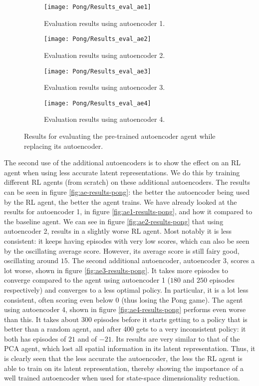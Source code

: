 \begin{figure}[h]
	\centering
	\begin{subfigure}[b]{0.40\textwidth}
		\texttt{[image: Pong/Results\_eval\_ae1]}
		\caption{Evaluation results using autoencoder 1.}
	\end{subfigure}\hfill
	\begin{subfigure}[b]{0.40\textwidth}
		\texttt{[image: Pong/Results\_eval\_ae2]}
		\caption{Evaluation results using autoencoder 2.}
		\medskip
	\end{subfigure}
	\begin{subfigure}[b]{0.4\textwidth}
		\texttt{[image: Pong/Results\_eval\_ae3]}
		\caption{Evaluation results using autoencoder 3.}
	\end{subfigure}\hfill
	\begin{subfigure}[b]{0.4\textwidth}
		\texttt{[image: Pong/Results\_eval\_ae4]}
		\caption{Evaluation results using autoencoder 4.}
	\end{subfigure}
	\caption{Results for evaluating the pre-trained autoencoder agent while replacing its autoencoder.}
	\label{fig:ae-evals}
\end{figure}

The second use of the additional autoencoders is to show the effect on an RL agent when using less accurate latent representations. We do this by training different RL agents (from scratch) on these additional autoencoders. The results can be seen in figure \ref{fig:ae-results-pong}: the better the autoencoder being used by the RL agent, the better the agent trains. We have already looked at the results for autoencoder 1, in figure \ref{fig:ae1-results-pong}, and how it compared to the baseline agent. We can see in figure \ref{fig:ae2-results-pong} that using autoencoder 2, results in a slightly worse RL agent. Most notably it is less consistent: it keeps having episodes with very low scores, which can also be seen by the oscillating average score. However, its average score is still fairy good, oscillating around $15$. The second additional autoencoder, autoencoder 3, scores a lot worse, shown in figure \ref{fig:ae3-results-pong}. It takes more episodes to converge compared to the agent using autoencoder 1 ($180$ and $250$ episodes respectively) and converges to a less optimal policy. In particular, it is a lot less consistent, often scoring even below $0$ (thus losing the Pong game). The agent using autoencoder 4, shown in figure \ref{fig:ae4-results-pong} performs even worse than this. It takes about $300$ episodes before it starts getting to a policy that is better than a random agent, and after $400$ gets to a very inconsistent policy: it both has episodes of $21$ and of $-21$. Its results are very similar to that of the PCA agent, which lost all spatial information in its latent representation. Thus, it is clearly seen that the less accurate the autoencoder, the less the RL agent is able to train on its latent representation, thereby showing the importance of a well trained autoencoder when used for state-space dimensionality reduction.


